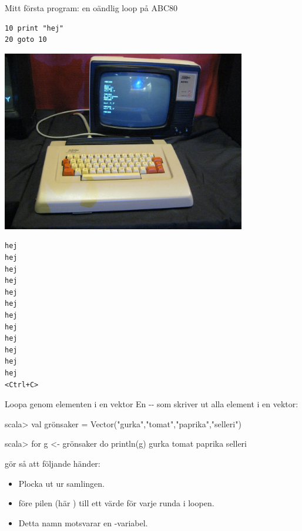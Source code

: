 \ifkompendium\else
\begin{SlideExtra}{Mitt första program: en oändlig loop på ABC80}
\begin{minipage}{0.8\textwidth}
\begin{verbatim}
10 print "hej"
20 goto 10
\end{verbatim}
\includegraphics[width=0.8\textwidth]{../img/abc80.jpg}
\end{minipage}%
\begin{minipage}{0.2\textwidth}
\pause
\begin{verbatim}
hej
hej
hej
hej
hej
hej
hej
hej
hej
hej
hej
hej
<Ctrl+C>
\end{verbatim}
\end{minipage}
\end{SlideExtra}
\fi

\begin{Slide}{Loopa genom elementen i en vektor}
En -- som skriver ut alla element i en vektor:
\begin{REPL}
scala> val grönsaker = Vector("gurka","tomat","paprika","selleri")

scala> for g <- grönsaker do println(g)
gurka
tomat
paprika
selleri

\end{REPL}
 gör så att följande händer:
\begin{itemize}
  \item Plocka ut  ur samlingen. 
  \item {} före pilen (här )  till ett  värde för varje runda i loopen.
  \item Detta namn motsvarar en  -variabel.
\end{itemize}
\end{Slide}


